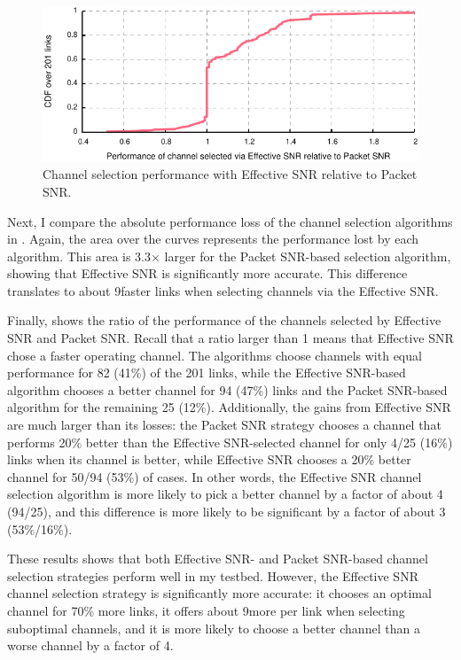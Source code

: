 \begin{figure}[p]
	\centering
	\includegraphics[width=\textwidth]{figures/applications/chan_sel_ratio.pdf}
	\caption[Channel selection algorithm performance with Effective SNR relative to Packet SNR]{\label{fig:chan_sel_ratio}Channel selection performance with Effective SNR relative to Packet SNR.}
\end{figure}

Next, I compare the absolute performance loss of the channel selection algorithms in . Again, the area over the curves represents the performance lost by each algorithm. This area is 3.3$\times$ larger for the Packet SNR-based selection algorithm, showing that Effective SNR is significantly more accurate. This difference translates to about 9\Mbps faster links when selecting channels via the Effective SNR.

Finally,  shows the ratio of the performance of the channels selected by Effective SNR and Packet SNR. Recall that a ratio larger than 1 means that Effective SNR chose a faster operating channel. The algorithms choose channels with equal performance for 82 (41\%) of the 201 links, while the Effective SNR-based algorithm chooses a better channel for 94 (47\%) links and the Packet SNR-based algorithm for the remaining 25 (12\%). Additionally, the gains from Effective SNR are much larger than its losses: the Packet SNR strategy chooses a channel that performs 20\% better than the Effective SNR-selected channel for only 4/25 (16\%) links when its channel is better, while Effective SNR chooses a 20\% better channel for 50/94 (53\%) of cases. In other words, the Effective SNR channel selection algorithm is more likely to pick a better channel by a factor of about 4 (94/25), and this difference is more likely to be significant by a factor of about 3 (53\%/16\%).

These results shows that both Effective SNR- and Packet SNR-based channel selection strategies perform well in my testbed. However, the Effective SNR channel selection strategy is significantly more accurate: it chooses an optimal channel for 70\% more links, it offers about 9\Mbps more per link when selecting suboptimal channels, and it is more likely to choose a better channel than a worse channel by a factor of 4.

